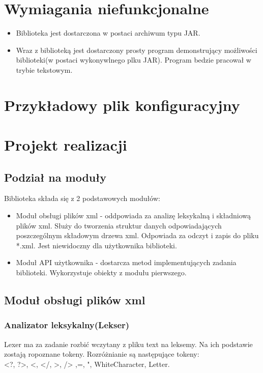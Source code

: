 \documentclass{article}
\begin{document}
\section{Wymiagania niefunkcjonalne}
\begin{itemize}
	\item Biblioteka jest dostarczona w postaci archiwum typu JAR.
	\item Wraz z biblioteką jest dostarczony prosty program demonstrujący możliwości biblioteki(w postaci wykonywlnego plku JAR).
	Program bedzie pracował w trybie tekstowym.
\end{itemize}

\section{Przykładowy plik konfiguracyjny}


\newpage
\section{Projekt realizacji}

\subsection{Podział na moduły}
Biblioteka  składa się z 2 podstawowych modułów:
\begin{itemize}
	\item Moduł obsługi plików xml - oddpowiada za analizę leksykalną i składniową plików xml.
	Służy do tworzenia struktur danych odpowiadających poszczególnym składowym drzewa xml.
	Odpowiada za odczyt i zapis do pliku *.xml. Jest niewidoczny dla użytkownika biblioteki.
	\item Moduł API użytkownika - dostarcza metod implementujących zadania biblioteki.
	Wykorzystuje obiekty z modułu pierwszego.
\end{itemize}

\subsection{Moduł obsługi plików xml}


\subsubsection{Analizator leksykalny(Lekser)}
Lexer ma za zadanie rozbić wczytany z pliku text na leksemy.
Na ich podstawie zostają ropoznane tokeny.
Rozróżnianie są następujące tokeny: \\
<?, ?>, <, </, >, /> ,=, ", WhiteCharacter, Letter.
\end{document}
